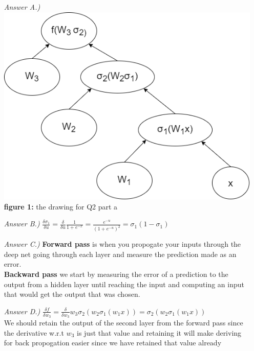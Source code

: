 \documentclass{article}
\theoremstyle{definition}
\theoremstyle{remark}
\begin{document}
\begin{enumerate}[font={\Large\bfseries}]
\begin{itemize}
		\end{itemize}
		
        
		\begin{itemize}
			\item[\textit{Answer A.)}] \includegraphics[scale=0.2]{deepNetDrawing.png}\\
			\textbf{figure 1:} the drawing for Q2 part a\\

			\item[\textit{Answer B.)}] $\frac{\delta \sigma_1}{\delta u} =
			\frac{\delta}{\delta u} \frac{1}{1+e^{-x}} = 
			\frac{e^{-u}}{(1+e^{-u})^2} = 
			\sigma_1(1 - \sigma_1)$\\

			\item[\textit{Answer C.)}] \textbf{Forward pass} is when you propogate your inputs through the deep net going through each layer and
			measure the prediction made as an error.\\
			\textbf{Backward pass} we start by measuring the error of a prediction to the output from a hidden layer until reaching the input and
			computing an input that would get the output that was chosen.

			\item[\textit{Answer D.)}] $\frac{\delta f}{\delta w_3} = 
			\frac{\delta}{\delta w_3} w_3 \sigma_2 (w_2 \sigma_1 (w_1 x)) = \sigma_2 (w_2 \sigma_1 (w_1 x))$\\
			We should retain the output of the second layer from the forward pass since the derivative w.r.t $w_3$ is just that value and retaining
			it will make deriving for back propogation easier since we have retained that value already
			

\end{itemize}
\end{enumerate}
\end{document}

